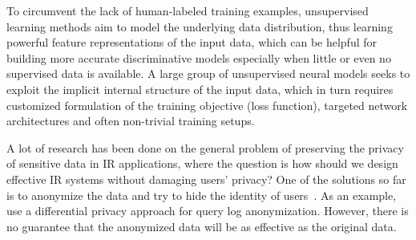 


To circumvent the lack of human-labeled training examples, unsupervised learning methods aim to model the underlying data distribution, thus learning powerful feature representations of the input data, which can be helpful for building more accurate discriminative models especially when little or even no supervised data is available. A large group of unsupervised neural models seeks to exploit the implicit internal structure of the input data, which in turn requires customized formulation of the training objective (loss function), targeted network architectures and often non-trivial training setups. 




A lot of research has been done on the general problem of preserving the privacy of sensitive data in IR applications, where the question is how should we design effective IR systems without damaging users' privacy?  One of the solutions so far is to anonymize the data and try to hide the identity of users~\citep{Carpineto:2013, Zhang:2016}.  As an example, \citet{Zhang:2016} use a differential privacy approach for query log anonymization. However, there is no guarantee that the anonymized data will be as effective as the original data.

